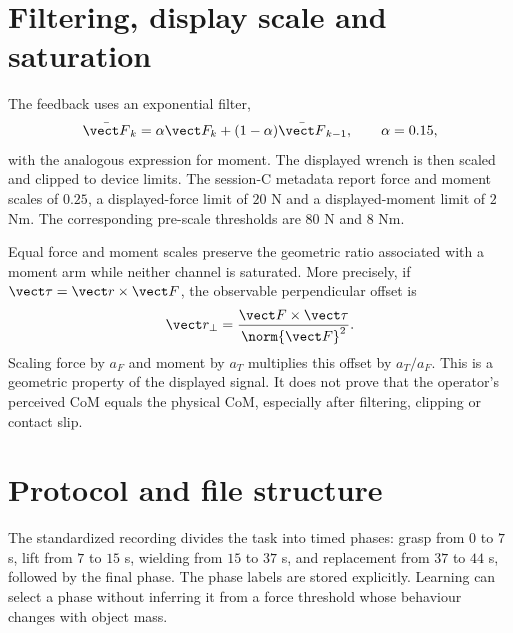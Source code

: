 \section{Filtering, display scale and saturation}

The feedback uses an exponential filter,
\begin{equation}
\bar{\vect F}_k=\alpha\vect F_k+(1-\alpha)\bar{\vect F}_{k-1},
\qquad \alpha=0.15,
\end{equation}
with the analogous expression for moment. The displayed wrench is then scaled and clipped to device limits. The session-C metadata report force and moment scales of $0.25$, a displayed-force limit of $20$ N and a displayed-moment limit of $2$ Nm. The corresponding pre-scale thresholds are $80$ N and $8$ Nm.

Equal force and moment scales preserve the geometric ratio associated with a moment arm while neither channel is saturated. More precisely, if $\vect\tau=\vect r\times\vect F$, the observable perpendicular offset is
\begin{equation}
\vect r_\perp=\frac{\vect F\times\vect\tau}{\norm{\vect F}^2}.
\end{equation}
Scaling force by $a_F$ and moment by $a_T$ multiplies this offset by $a_T/a_F$. This is a geometric property of the displayed signal. It does not prove that the operator's perceived CoM equals the physical CoM, especially after filtering, clipping or contact slip.

\section{Protocol and file structure}

The standardized recording divides the task into timed phases: grasp from $0$ to $7$ s, lift from $7$ to $15$ s, wielding from $15$ to $37$ s, and replacement from $37$ to $44$ s, followed by the final phase. The phase labels are stored explicitly. Learning can select a phase without inferring it from a force threshold whose behaviour changes with object mass.

